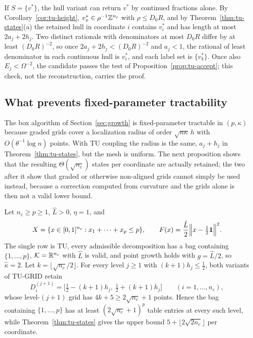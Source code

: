 \begin{remark}\label{rem:tu-cf}
If $S=\{v^*\}$, the hull variant can return $v^*$ by continued fractions
alone. By Corollary~\ref{cor:tu-height}, $v^*_x\in\rho^{-1}\mathbb Z^{n_c}$ with
$\rho\le D_0R$, and by Theorem~\ref{thm:tu-states}(a) the retained hull in
coordinate $i$ contains $v^*_i$ and has length at most $2a_j+2h_j$. Two
distinct rationals with denominators at most $D_0R$ differ by at least
$(D_0R)^{-2}$, so once $2a_j+2h_j<(D_0R)^{-2}$ and $a_j<1$, the rational of
least denominator in each continuous hull is $v^*_i$, and each label set is
$\{v^*_k\}$. Once also $E_j<\Omega^{-2}$, the candidate passes the test of
Proposition~\ref{prop:tu-accept}; this check, not the reconstruction, carries
the proof.
\end{remark}

\subsection{What prevents fixed-parameter tractability}\label{sec:tu-limits}

The box algorithm of Section~\ref{sec:growth} is fixed-parameter tractable in
$(p,\kappa)$ because graded grids cover a localization radius of order
$\sqrt{n\kappa}\,h$ with $O(\theta^{-1}\log n)$ points. With TU coupling the
radius is the same, $a_j+h_j$ in Theorem~\ref{thm:tu-states}, but the mesh is
uniform. The next proposition shows that the resulting $\Theta(\sqrt{n_c})$
states per coordinate are actually retained; the two after it show that
graded or otherwise non-aligned grids cannot simply be used instead, because
a correction computed from curvature and the grids alone is then not a valid
lower bound.

\begin{proposition}\label{prop:tu-tight}
Let $n_c\ge p\ge1$, $\hat L>0$, $\eta=1$, and
\[
X=\{x\in[0,1]^{n_c}:x_1+\dots+x_p\le p\},\qquad
F(x)=\frac{\hat L}2\Bigl\lVert x-\tfrac12\mathbf 1\Bigr\rVert^2 .
\]
The single row is TU, every admissible decomposition has a bag containing
$\{1,\dots,p\}$, $\mathcal K=\mathbb R^{n_c}$ with $\hat L$ is valid, and point
growth holds with $g=\hat L/2$, so $\hat\kappa=2$. Let
$k=\lfloor\sqrt{n_c}/2\rfloor$. For every level $j\ge1$ with
$(k+1)h_j\le\frac12$, both variants of TU-GRID retain
\[
D^{(j+1)}_i=\bigl[\tfrac12-(k+1)h_j,\ \tfrac12+(k+1)h_j\bigr]\qquad(i=1,\dots,n_c),
\]
whose level-$(j+1)$ grid has $4k+5\ge2\sqrt{n_c}+1$ points. Hence the bag
containing $\{1,\dots,p\}$ has at least $(2\sqrt{n_c}+1)^p$ table entries at
every such level, while Theorem~\ref{thm:tu-states} gives the upper bound
$5+\lfloor2\sqrt{2n_c}\rfloor$ per coordinate.
\end{proposition}

